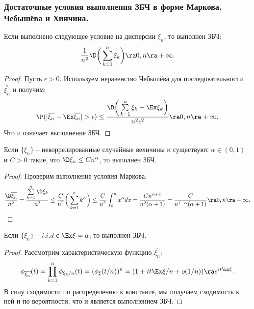\subsubsection{Достаточные условия выполнення ЗБЧ в форме Маркова, Чебышёва и Хинчина.}
\begin{theorem}
    Если выполнено следующее условие на дисперсии $\xi_n$, то выполнен ЗБЧ:
    \[
        \dfrac{1}{n^2}\D\biggr(\sum\limits_{k = 1}^{n} \xi_k\biggr) \ra 0, n \ra +\infty.
    \]
\end{theorem}
\begin{proof}
    Пусть $\epsilon > 0$.
    Используем неравенство Чебышёва для последовательности $\overline{\overset{\circ}{\xi_n}}$ и получим:
    \[
        \P(|\overline{\xi_n} - \Ex \overline{\xi_n}| > \epsilon) \leq \dfrac{\D\biggr( \sum\limits_{k = 1}^{n} \xi_k  - \Ex \xi_k \biggr)}{n^2\epsilon^2} \ra 0, n \ra +\infty.
    \]
    Что и означает выполнение ЗБЧ.
\end{proof}
\begin{corollary}
    Если $\{\xi_n\}$ -- некоррелированные случайные величины и существуют $\alpha \in (0, 1)$ и $C > 0$ такие, что $\D \xi_n \leq C n^{\alpha}$, то выполнен ЗБЧ.
\end{corollary}
\begin{proof}
    Проверим выполнение условия Маркова:
    \[
        \dfrac{\D \overline{\xi_n}}{n^2} = \dfrac{\sum\limits_{k = 1}^n \D\xi_k}{n^2} \leq \dfrac{C}{n^2}\biggr(\sum\limits_{k = 1}^{n} k^\alpha\biggr) \leq \dfrac{C}{n^2}\int_0^{n} x^{\alpha} dx = \dfrac{C n^{\alpha + 1}}{n^2 (\alpha + 1)} = \dfrac{C}{n^{1 - \alpha}(\alpha + 1)} \ra 0, n \ra +\infty.
    \]
\end{proof}
\begin{theorem}
    Если $\{\xi_n\}$ -- $i.i.d$ с $\Ex \xi = a$, то выполнен ЗБЧ.
\end{theorem}
\begin{proof}
    Рассмотрим характеристическую функцию $\overline{\xi_n}$:
    \[
        \phi_{\overline{\xi_n}}(t) = \prod\limits_{k = 1}^{n} \phi_{\xi_k/n}(t) = (\phi_{\xi}(t/n))^n = (1 + it \Ex \xi/n + o(1/n)) \ra e^{it \Ex \xi}.
    \]
    В силу сходимости по распределению к константе, мы получаем сходимость к ней и по вероятности, что и является выполнением ЗБЧ.
\end{proof}
